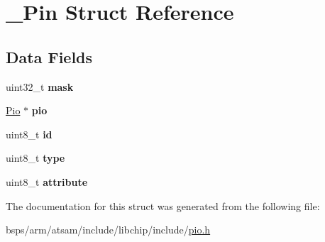 \hypertarget{struct__Pin}{}\section{\+\_\+\+Pin Struct Reference}
\label{struct__Pin}
\subsection*{Data Fields}
\begin{DoxyCompactItemize}
\item 
\mbox{\label{struct__Pin_a22229becfc57eeba352787c9e7b3dba5}} 
uint32\+\_\+t {\bfseries mask}
\item 
\mbox{\label{struct__Pin_ad53b0ab1b267a0af9a6af46c291fafd6}} 
\mbox{\hyperlink{structPio}{Pio}} $\ast$ {\bfseries pio}
\item 
\mbox{\label{struct__Pin_a2c118659e818bad4f7effbb5cce3eb66}} 
uint8\+\_\+t {\bfseries id}
\item 
\mbox{\label{struct__Pin_a952ed5cf8dc3e1fb8980f1611988c483}} 
uint8\+\_\+t {\bfseries type}
\item 
\mbox{\label{struct__Pin_ae9bb7df440a1c851f54976dc7c62031a}} 
uint8\+\_\+t {\bfseries attribute}
\end{DoxyCompactItemize}


The documentation for this struct was generated from the following file\+:\begin{DoxyCompactItemize}
\item 
bsps/arm/atsam/include/libchip/include/\mbox{\hyperlink{pio_8h}{pio.\+h}}\end{DoxyCompactItemize}
